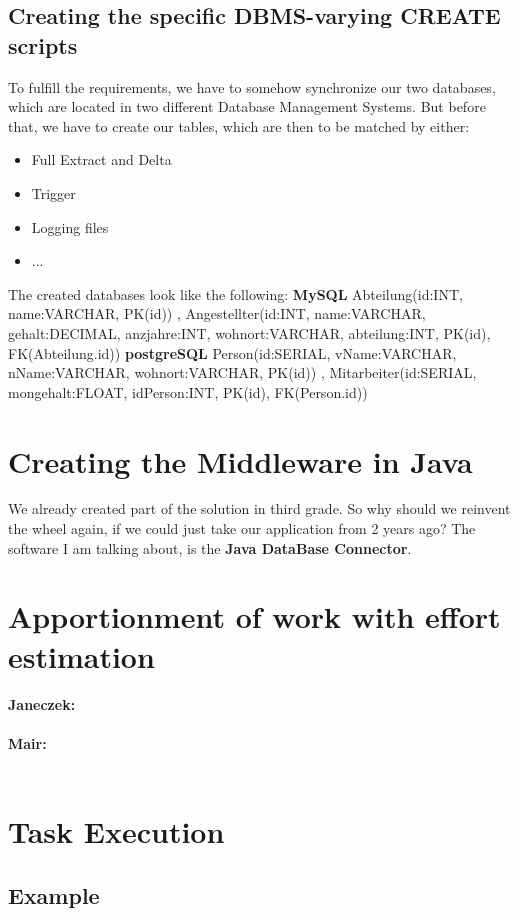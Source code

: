 \documentclass[11pt,a4paper]{article}
\begin{document}
\subsection{Creating the specific DBMS-varying CREATE scripts}
To fulfill the requirements, we have to somehow synchronize our two databases, which are located in two different Database Management Systems. But before that, we have to create our tables, which are then to be matched by either:
\begin{itemize}
	\item Full Extract and Delta
	\item Trigger
	\item Logging files
	\item ...
\end{itemize}
\noindent The created databases look like the following: \newline \newline
\textbf{MySQL} Abteilung(id:INT, name:VARCHAR, PK(id)) , Angestellter(id:INT, name:VARCHAR, gehalt:DECIMAL, anzjahre:INT, wohnort:VARCHAR, abteilung:INT, PK(id), FK(Abteilung.id)) \newline \newline
\textbf{postgreSQL} Person(id:SERIAL, vName:VARCHAR, nName:VARCHAR, wohnort:VARCHAR, PK(id)) , Mitarbeiter(id:SERIAL, mongehalt:FLOAT, idPerson:INT, PK(id), FK(Person.id))

\newpage
\section{Creating the Middleware in Java}
We already created part of the solution in third grade. So why should we reinvent the wheel again, if we could just take our application from 2 years ago? The software I am talking about, is the \textbf{Java DataBase Connector}.




\newpage
\section{Apportionment of work with effort estimation}

\textbf{Janeczek:} \\ \\
\textbf{Mair:} \\ \\

\newpage
\section{Task Execution}
\subsection{Example}

\newpage
\end{document}
